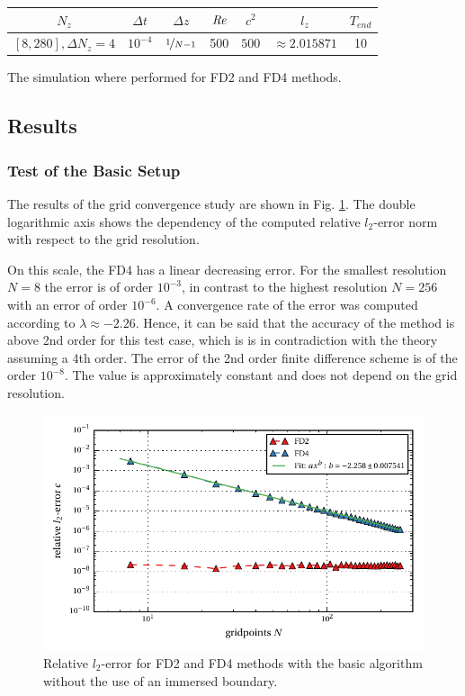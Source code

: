 \begin{center}
\vspace*{0.7ex}
\begin{tabular}{c|c|c|c|c|c|c }
 $ N_z  $                       &  $\Delta t$ & $\Delta z$            & $\mbox{\textit{Re}}$  & $c^2$   & $l_z$ & $T_{end}$\\
\hline
 $[8, 280], \Delta N_z = 4 $ &  $10^{-4}$ & $\nicefrac{1}{N - 1}$ & 500     & $500$   & $\approx{2.015871}$  & 10\\
\end{tabular}
\vspace*{0.7ex}
\end{center}

The simulation where performed for FD2 and FD4 methods.

\clearpage

\subsection{Results}
\subsubsection{Test of the Basic Setup}

The results of the grid convergence study are shown in Fig. \ref{fig:ema1}.
The double logarithmic axis shows the dependency of the computed relative $l_2$-error norm
with respect to the grid resolution.

On this scale, the FD4 has a linear decreasing error.
For the smallest resolution $N=8$ the error is of order $10^{-3}$,
in contrast to the highest resolution $N=256$ with an error of order $10^{-6}$.
A convergence rate of the error  was computed  according to $\lambda\approx -2.26$.
Hence, it can be said that the accuracy of the method is above 2nd order for this test case,
which is is in contradiction with the theory assuming a 4th order.
The error of the 2nd order finite difference scheme is of the order $10^{-8}$.
The value is approximately constant and does not depend on the grid resolution.

\begin{figure}[!bp]
    \centering
    \includegraphics{gfx/immersed_boundary/poiseuille_flow/1_default/relative_l2error.pdf}
    \caption{Relative $l_2$-error for FD2 and FD4 methods with the basic algorithm without the use of an immersed boundary.\label{fig:ema1}}
\end{figure}


